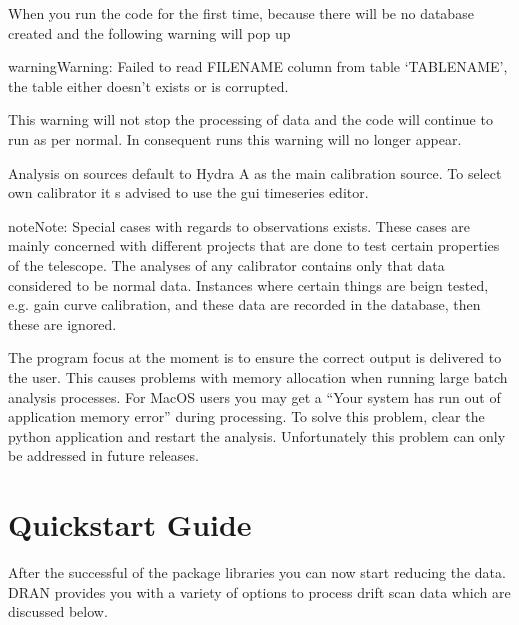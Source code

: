 \documentclass[letterpaper,10pt,english]{sphinxmanual}
\begin{document}
\sphinxAtStartPar
{}

\sphinxAtStartPar
When you run the code for the first time, because there will be no
database created and the following warning will pop up

\begin{sphinxadmonition}{warning}{Warning:}
\sphinxAtStartPar
Failed to read FILENAME column from table ‘TABLENAME’, the table either doesn’t exists or is corrupted.
\end{sphinxadmonition}

\sphinxAtStartPar
This warning will not stop the processing of data and the code will continue to run as per normal. In consequent runs this warning will no longer appear.

\sphinxAtStartPar
{}

\sphinxAtStartPar
Analysis on sources default to Hydra A as the main calibration source. To
select own calibrator it s advised to use the gui timeseries editor.

\begin{sphinxadmonition}{note}{Note:}
\sphinxAtStartPar
Special cases with regards to observations exists. These cases are mainly concerned
with different projects that are done to test certain properties of the telescope.
The analyses of any calibrator contains only that data considered to be normal data. Instances
where certain things are beign tested, e.g. gain curve calibration, and these data are recorded
in the database, then these are ignored.
\end{sphinxadmonition}

\sphinxAtStartPar
{}

\sphinxAtStartPar
The program focus at the moment is to ensure the correct output is delivered to the user. This
causes problems with memory allocation when running large batch analysis processes. For MacOS
users you may get a “Your system has run out of application memory error” during processing. To
solve this problem, clear the python application and restart the analysis. Unfortunately this
problem can only be addressed in future releases.

\sphinxstepscope


\section{Quickstart Guide}
\label{\detokenize{extras/quickstart:quickstart-guide}}\label{\detokenize{extras/quickstart::doc}}
\sphinxAtStartPar
After the successful  of the package libraries you can now start reducing the data. DRAN provides you with a variety of options to process drift scan data which are
discussed below.
\end{document}
